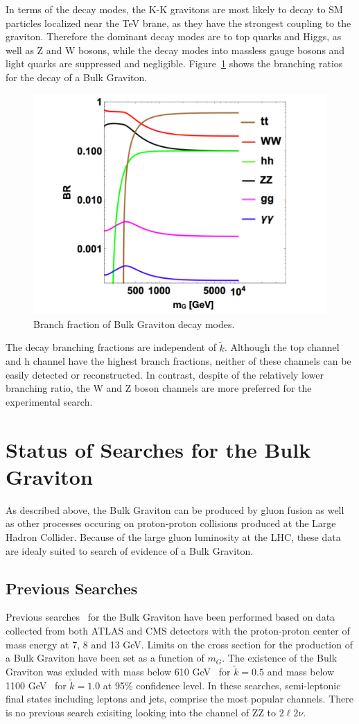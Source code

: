 In terms of the decay modes, the K-K gravitons are most likely to decay to SM particles localized near the TeV brane, as they have the strongest coupling to the graviton. Therefore the dominant decay modes are to top quarks and Higgs, as well as Z and W bosons, while the decay modes into massless gauge bosons and light quarks are suppressed and negligible. Figure~\ref{fig:intro_Gbr} shows the branching ratios for the decay of a Bulk Graviton.
\begin{figure}[htbp]
\begin{center}
\includegraphics[width=0.5\linewidth]{figures/intro_Gbr.pdf}
\caption{Branch fraction of Bulk Graviton decay modes.}
\label{fig:intro_Gbr}
\end{center}
\end{figure}
The decay branching fractions are independent of $\tilde{k}$. Although the top channel and h channel have the highest branch fractions, neither of these channels can be easily detected or reconstructed. In contrast, despite of the relatively lower branching ratio, the W and Z boson channels are more preferred for the experimental search.

\section{Status of Searches for the Bulk Graviton} 
As described above, the Bulk Graviton can be produced by gluon fusion as well as other processes occuring on proton-proton collisions produced at the Large Hadron Collider. Because of the large gluon luminosity at the LHC, these data are idealy suited to search of evidence of a Bulk Graviton.
\subsection{Previous Searches}
Previous searches~\cite{Aad:2012nev,Aad:2013wxa,Aad:2014xka,Chatrchyan:2012baa,Khachatryan:2014gha,Aaboud:2016okv} for the Bulk Graviton have been performed based on data collected from both ATLAS and CMS detectors with the proton-proton center of mass energy at 7, 8 and 13 GeV. Limits on the cross section for the production of a Bulk Graviton have been set as a function of $m_{G}$. The existence of the Bulk Graviton was exluded with mass below 610 GeV~\cite{Chatrchyan:2012baa} for $\tilde{k}=0.5$ and mass below 1100 GeV~\cite{Aaboud:2016okv} for $\tilde{k}=1.0$ at 95\% confidence level. In these searches, semi-leptonic final states including leptons and jets, comprise the most popular channels. There is no previous search exisiting looking into the channel of ZZ to $2\ell 2\nu$.
